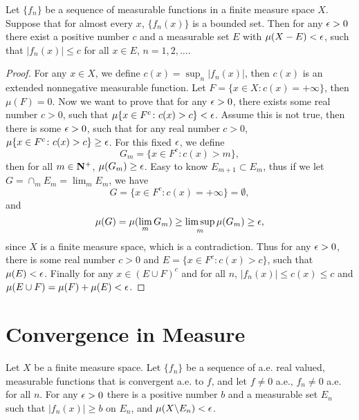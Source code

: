 \begin{pro}%
	Let $\{f_n\}$ be a sequence of measurable functions  in a finite measure space $X$. Suppose that for almost every $x$, $\{f_n(x)\}$ is a bounded set. Then for any $\epsilon>0$ there exist a positive number $c$ and a measurable set $E$ with $\mu(X-E)<\epsilon$, such that $|f_n(x)|\leq c$ for all $x\in E$, $n=1,2,\ldots$.
\end{pro}
\begin{proof}
	For any $x\in X$, we define $c(x)=\sup_n |f_n(x)|$, then $c(x)$ is an extended nonnegative measurable function. Let $F=\{x\in X\colon  c(x)=+\infty\}$, then $\mu(F)=0$. Now we want to prove that for any $\epsilon>0$, there exists some real number $c>0$, such that $\mu\{x\in F^c\colon c(x)>c\}<\epsilon$. Assume this is not true, then there is some $\epsilon>0$, such that for any real number $c>0$, $\mu\{x\in F^c\colon c(x)>c\}\geq \epsilon$. For this fixed $\epsilon$, we define
	\[G_m=\{x\in F^c\colon c(x)>m\},\] then for all $m\in\mathbf{N}^+$, $\mu(G_m)\geq \epsilon$. Easy to know $E_{m+1}\subset E_{m}$, thus if we let
	$G=\cap_m E_m=\lim_m E_m$, we have 
	\[G=\{x\in F^c\colon c(x)=+\infty\}=\emptyset,\]and
	\[\mu(G)=\mu(\lim_m G_m)\geq \limsup_m \mu(G_m)\geq \epsilon,\]since $X$ is a finite measure space, which is a contradiction.
	Thus for any $\epsilon>0$, there is some real number $c>0$ and $E=\{x\in F^c\colon c(x)>c\}$, such that $\mu(E)<\epsilon$. Finally for any $x\in (E\cup F)^c$ and for all $n$, $|f_n(x)|\leq c(x)\leq c$ and $\mu(E\cup F)=\mu(F)+\mu(E)<\epsilon$.
\end{proof}

\section{Convergence in Measure}
\begin{pro}%
 	Let $X$ be a finite measure space. Let $\{f_n\}$ be a sequence of a.e. real valued, measurable functions that is convergent a.e. to $f$, and let $f\neq 0$ a.e., $f_n\neq 0$ a.e. for all $n$. For any $\epsilon>0$ there is a positive number $b$ and a measurable set $E_n$ such that $|f_n(x)|\geq b$ on $E_n$, and $\mu(X\backslash E_n)<\epsilon$.
 \end{pro}

